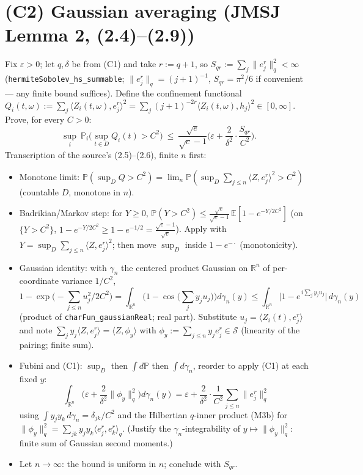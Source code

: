 \documentclass[11pt]{article}
\theoremstyle{plain}
\theoremstyle{remark}
\newcommand{\E}{\mathbb{E}}\newcommand{\PP}{\mathbb{P}}\newcommand{\R}{\mathbb{R}}
\newcommand{\eps}{\varepsilon}\newcommand{\Sch}{\mathcal{S}}
\newcommand{\ip}[2]{\langle #1,#2\rangle}
\begin{document}
\section*{(C2) Gaussian averaging (JMSJ Lemma 2, (2.4)--(2.9))}

Fix $\eps>0$; let $q,\delta$ be from (C1) and take $r:=q+1$, so
$S_{qr}:=\sum_j\|e^r_j\|_q^2<\infty$ (\texttt{hermiteSobolev\_hs\_summable};
$\|e_j^r\|_q=(j+1)^{-1}$, $S_{qr}=\pi^2/6$ if convenient --- any finite
bound suffices). Define the confinement functional
$Q_i(t,\omega):=\sum_j\ip{Z_i(t,\omega)}{e^r_j}^2
=\sum_j(j+1)^{-2r}\ip{Z_i(t,\omega)}{h_j}^2\in[0,\infty]$.
Prove, for every $C>0$:
\[
\sup_i\ \PP_i\Big(\sup_{t\in D}Q_i(t)>C^2\Big)\ \le\
\frac{\sqrt e}{\sqrt e-1}\Big(\eps+\frac{2}{\delta^2}\cdot
\frac{S_{qr}}{C^2}\Big).
\]
Transcription of the source's (2.5)--(2.6), finite $n$ first:
\begin{itemize}
\item[(a)] Monotone limit: $\PP(\sup_DQ>C^2)=\lim_n\PP(\sup_D
\sum_{j\le n}\ip{Z}{e^r_j}^2>C^2)$ (countable $D$, monotone in $n$).
\item[(b)] Badrikian/Markov step: for $Y\ge0$,
$\PP(Y>C^2)\le\frac{\sqrt e}{\sqrt e-1}\,\E[1-e^{-Y/2C^2}]$ (on
$\{Y>C^2\}$, $1-e^{-Y/2C^2}\ge1-e^{-1/2}=\frac{\sqrt e-1}{\sqrt e}$).
Apply with $Y=\sup_D\sum_{j\le n}\ip{Z}{e^r_j}^2$; then move $\sup_D$
inside $1-e^{-\cdot}$ (monotonicity).
\item[(c)] Gaussian identity: with $\gamma_n$ the centered product
Gaussian on $\R^n$ of per-coordinate variance $1/C^2$,
\[
1-\exp\Big(-\sum_{j\le n}u_j^2/2C^2\Big)
=\int_{\R^n}\Big(1-\cos\big(\textstyle\sum_jy_ju_j\big)\Big)d\gamma_n(y)
\le\int_{\R^n}\big|1-e^{\,i\sum_jy_ju_j}\big|\,d\gamma_n(y)
\]
(product of \texttt{charFun\_gaussianReal}; real part). Substitute
$u_j=\ip{Z_i(t)}{e^r_j}$ and note
$\sum_jy_j\ip{Z}{e^r_j}=\ip{Z}{\phi_y}$ with
$\phi_y:=\sum_{j\le n}y_je^r_j\in\Sch$ (linearity of the pairing;
finite sum).
\item[(d)] Fubini and (C1): $\sup_D$ then $\int d\PP$ then
$\int d\gamma_n$, reorder to apply (C1) at each fixed $y$:
\[
\int_{\R^n}\Big(\eps+\frac2{\delta^2}\|\phi_y\|_q^2\Big)d\gamma_n(y)
=\eps+\frac2{\delta^2}\cdot\frac1{C^2}\sum_{j\le n}\|e^r_j\|_q^2
\]
using $\int y_jy_k\,d\gamma_n=\delta_{jk}/C^2$ and the Hilbertian
$q$-inner product (M3b) for
$\|\phi_y\|_q^2=\sum_{jk}y_jy_k\ip{e^r_j}{e^r_k}_q$. (Justify the
$\gamma_n$-integrability of $y\mapsto\|\phi_y\|_q^2$: finite sum of
Gaussian second moments.)
\item[(e)] Let $n\to\infty$: the bound is uniform in $n$; conclude with
$S_{qr}$.
\end{itemize}
\end{document}
